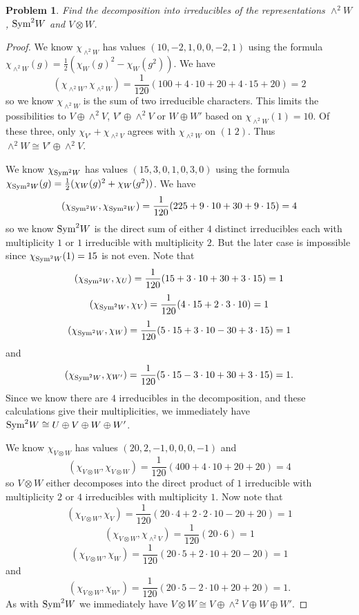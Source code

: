 \documentclass{article}
\newtheorem{problem}{Problem}
\newcommand{\sym}{\textup{Sym}}
\begin{document}
\begin{problem}
Find the decomposition into irreducibles of the representations $\wedge^2 W$, $\sym^2 W$ and $V \otimes W$.
\end{problem}
\begin{proof}
We know $\chi_{\wedge^2 W}$ has values $(10, -2, 1, 0, 0, -2, 1)$ using the formula $\chi_{\wedge^2 W}(g) = \frac{1}{2} (\chi_W (g)^2 - \chi_W (g^2))$. We have
\[
(\chi_{\wedge^2 W}, \chi_{\wedge^2 W}) = \frac{1}{120} (100 + 4 \cdot 10 + 20 + 4 \cdot 15 + 20) = 2
\]
so we know $\chi_{\wedge^2 W}$ is the sum of two irreducible characters. This limits the possibilities to $V \oplus \wedge^2 V$, $V' \oplus \wedge^2 V$ or $W \oplus W'$ based on $\chi_{\wedge^2 W}(1) = 10$. Of these three, only $\chi_{V'} + \chi_{\wedge^2 V}$ agrees with $\chi_{\wedge^2 W}$ on $(1 \; 2)$. Thus $\wedge^2 W \cong V' \oplus \wedge^2 V$.

We know $\chi_{\sym^2 W}$ has values $(15, 3, 0, 1, 0, 3, 0)$ using the formula $\chi_{\sym^2 W}(g) = \frac{1}{2} (\chi_W(g)^2 + \chi_W(g^2))$. We have
\[
(\chi_{\sym^2 W}, \chi_{\sym^2 W}) = \frac{1}{120} (225 + 9 \cdot 10 + 30 + 9 \cdot 15) = 4
\]
so we know $\sym^2 W$ is the direct sum of either $4$ distinct irreducibles each with multiplicity $1$ or $1$ irreducible with multiplicity $2$. But the later case is impossible since $\chi_{\sym^2 W}(1) = 15$ is not even. Note that
\[
(\chi_{\sym^2 W}, \chi_U) = \frac{1}{120} (15 + 3 \cdot 10 + 30 + 3 \cdot 15) = 1
\]
\[
(\chi_{\sym^2 W}, \chi_V) = \frac{1}{120} (4 \cdot 15 + 2 \cdot 3 \cdot 10) = 1
\]
\[
(\chi_{\sym^2 W}, \chi_W) = \frac{1}{120} (5 \cdot 15 + 3 \cdot 10 - 30 + 3 \cdot 15) = 1
\]
and
\[
(\chi_{\sym^2 W}, \chi_{W'}) = \frac{1}{120} (5 \cdot 15 - 3 \cdot 10 + 30 + 3 \cdot 15) = 1.
\]
Since we know there are $4$ irreducibles in the decomposition, and these calculations give their multiplicities, we immediately have $\sym^2 W \cong U \oplus V \oplus W \oplus W'$.

We know $\chi_{V \otimes W}$ has values $(20, 2, -1, 0, 0, 0, -1)$ and
\[
(\chi_{V \otimes W}, \chi_{V \otimes W}) = \frac{1}{120} (400 + 4 \cdot 10 + 20 + 20) = 4
\]
so $V \otimes W$ either decomposes into the direct product of $1$ irreducible with multiplicity $2$ or $4$ irreducibles with multiplicity $1$. Now note that
\[
(\chi_{V \otimes W}, \chi_V) = \frac{1}{120} (20 \cdot 4 + 2 \cdot 2 \cdot 10 - 20 + 20) = 1
\]
\[
(\chi_{V \otimes W}, \chi_{\wedge^2 V}) = \frac{1}{120} (20 \cdot 6) = 1
\]
\[
(\chi_{V \otimes W}, \chi_W) = \frac{1}{120} (20 \cdot 5 + 2 \cdot 10 + 20 - 20) = 1
\]
and
\[
(\chi_{V \otimes W}, \chi_{W'}) = \frac{1}{120} (20 \cdot 5 - 2 \cdot 10 + 20 + 20) = 1.
\]
As with $\sym^2 W$ we immediately have $V \otimes W \cong V \oplus \wedge^2 V \oplus W \oplus W'$.
\end{proof}
\end{document}
